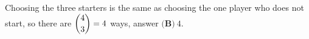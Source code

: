 Choosing the three starters is the same as choosing the one player who does not start, so there are $\dbinom43=4$ ways, answer $\boxed{\textbf{(B)}\ 4}$.
